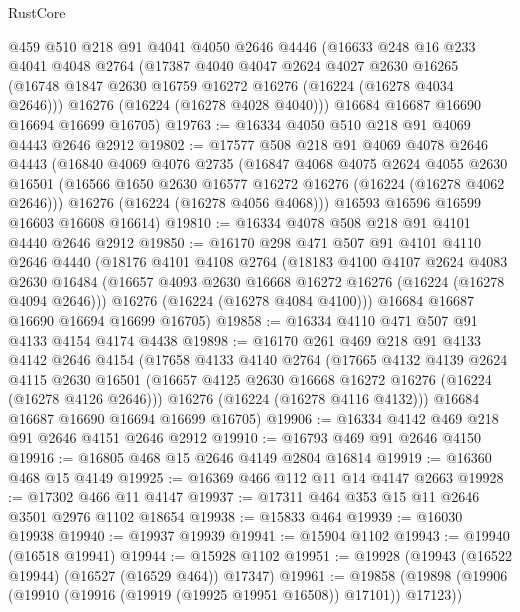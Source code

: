 \begin{lexlean}{RustCore}
\begin{coremodule}
    @459
    @510
    @218
    @91
    @4041
    @4050
    @2646
    @4446
    (@16633
      @248
      @16
      @233
      @4041
      @4048
      @2764
      (@17387
        @4040
        @4047
        @2624
        @4027
        @2630
        @16265
        (@16748 @1847 @2630 @16759 @16272 @16276 (@16224 (@16278 @4034 @2646)))
        @16276
        (@16224 (@16278 @4028 @4040)))
      @16684
      @16687
      @16690
      @16694
      @16699
      @16705)
@19763 := @16334 @4050 @510 @218 @91 @4069 @4443 @2646 @2912
@19802 := @17577
    @508
    @218
    @91
    @4069
    @4078
    @2646
    @4443
    (@16840
      @4069
      @4076
      @2735
      (@16847
        @4068
        @4075
        @2624
        @4055
        @2630
        @16501
        (@16566 @1650 @2630 @16577 @16272 @16276 (@16224 (@16278 @4062 @2646)))
        @16276
        (@16224 (@16278 @4056 @4068)))
      @16593
      @16596
      @16599
      @16603
      @16608
      @16614)
@19810 := @16334 @4078 @508 @218 @91 @4101 @4440 @2646 @2912
@19850 := @16170
    @298
    @471
    @507
    @91
    @4101
    @4110
    @2646
    @4440
    (@18176
      @4101
      @4108
      @2764
      (@18183
        @4100
        @4107
        @2624
        @4083
        @2630
        @16484
        (@16657 @4093 @2630 @16668 @16272 @16276 (@16224 (@16278 @4094 @2646)))
        @16276
        (@16224 (@16278 @4084 @4100)))
      @16684
      @16687
      @16690
      @16694
      @16699
      @16705)
@19858 := @16334 @4110 @471 @507 @91 @4133 @4154 @4174 @4438
@19898 := @16170
    @261
    @469
    @218
    @91
    @4133
    @4142
    @2646
    @4154
    (@17658
      @4133
      @4140
      @2764
      (@17665
        @4132
        @4139
        @2624
        @4115
        @2630
        @16501
        (@16657 @4125 @2630 @16668 @16272 @16276 (@16224 (@16278 @4126 @2646)))
        @16276
        (@16224 (@16278 @4116 @4132)))
      @16684
      @16687
      @16690
      @16694
      @16699
      @16705)
@19906 := @16334 @4142 @469 @218 @91 @2646 @4151 @2646 @2912
@19910 := @16793 @469 @91 @2646 @4150
@19916 := @16805 @468 @15 @2646 @4149 @2804 @16814
@19919 := @16360 @468 @15 @4149
@19925 := @16369 @466 @112 @11 @14 @4147 @2663
@19928 := @17302 @466 @11 @4147
@19937 := @17311 @464 @353 @15 @11 @2646 @3501 @2976 @1102 @18654
@19938 := @15833 @464
@19939 := @16030 @19938
@19940 := @19937 @19939
@19941 := @15904 @1102
@19943 := @19940 (@16518 @19941)
@19944 := @15928 @1102
@19951 := @19928 (@19943 (@16522 @19944) (@16527 (@16529 @464)) @17347)
@19961 := @19858 (@19898 (@19906 (@19910 (@19916 (@19919 (@19925 @19951 @16508)) @17101)) @17123))

\end{coremodule}
\end{lexlean}
